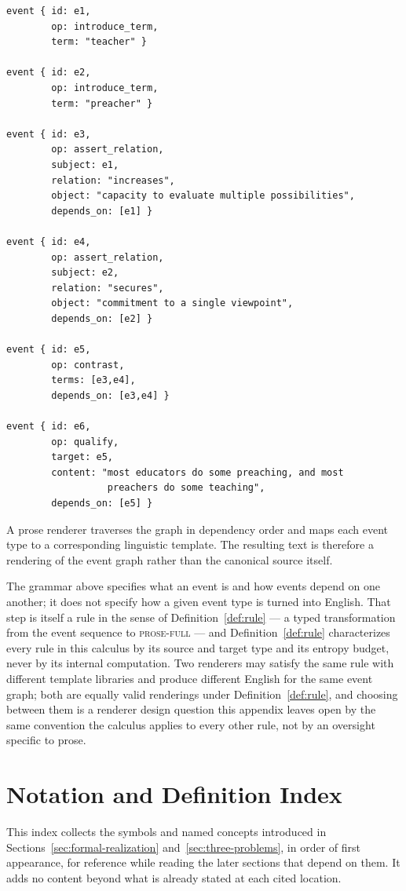 \documentclass[11pt]{article}
\theoremstyle{definition}
\begin{document}
\begin{verbatim}
event { id: e1,
        op: introduce_term,
        term: "teacher" }

event { id: e2,
        op: introduce_term,
        term: "preacher" }

event { id: e3,
        op: assert_relation,
        subject: e1,
        relation: "increases",
        object: "capacity to evaluate multiple possibilities",
        depends_on: [e1] }

event { id: e4,
        op: assert_relation,
        subject: e2,
        relation: "secures",
        object: "commitment to a single viewpoint",
        depends_on: [e2] }

event { id: e5,
        op: contrast,
        terms: [e3,e4],
        depends_on: [e3,e4] }

event { id: e6,
        op: qualify,
        target: e5,
        content: "most educators do some preaching, and most
                  preachers do some teaching",
        depends_on: [e5] }
\end{verbatim}

A prose renderer traverses the graph in dependency order and maps each event type to a corresponding linguistic template. The resulting text is therefore a rendering of the event graph rather than the canonical source itself.

The grammar above specifies what an event is and how events depend on one another; it does not specify how a given event type is turned into English. That step is itself a rule in the sense of Definition~\ref{def:rule} --- a typed transformation from the event sequence to \textsc{prose-full} --- and Definition~\ref{def:rule} characterizes every rule in this calculus by its source and target type and its entropy budget, never by its internal computation. Two renderers may satisfy the same rule with different template libraries and produce different English for the same event graph; both are equally valid renderings under Definition~\ref{def:rule}, and choosing between them is a renderer design question this appendix leaves open by the same convention the calculus applies to every other rule, not by an oversight specific to prose.

\section{Notation and Definition Index}

This index collects the symbols and named concepts introduced in Sections~\ref{sec:formal-realization} and~\ref{sec:three-problems}, in order of first appearance, for reference while reading the later sections that depend on them. It adds no content beyond what is already stated at each cited location.
\end{document}
